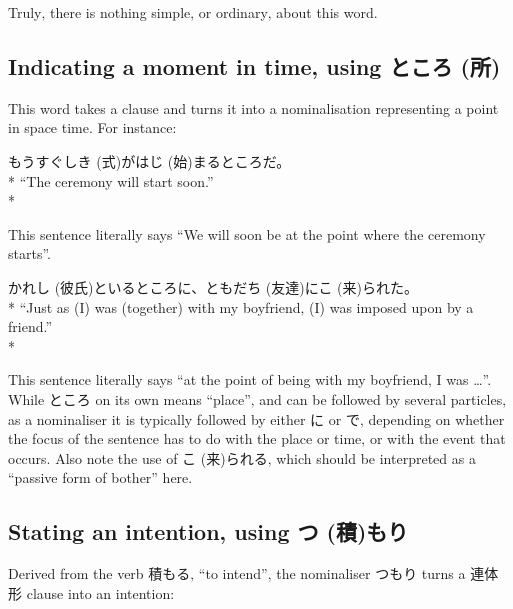 \documentclass[11pt, b5paper, twoside, openright, onecolumn]{book}
\makeatletter
\newcommand*{\rubystack}[2]{{\relscale{0.5}%
  \begin{tabular}[b]{@{}c@{}}%
    {#1}\\%
   {\textscale{2}{#2}}%
  \end{tabular}}%
}
\DeclareRobustCommand*{\ruby}[2]{%
  \mbox{%
    \setlength{\parskip}{0ex}%
    \BeginAccSupp{method=pdfstringdef,ActualText={#1}}%
      \rubystack{\phantom{#2}}{#1}%
      \llap{%
        \rubystack{#2}{\phantom{#1}}%
      }%
    \EndAccSupp{}%
  }%
}
\renewcommand*{\ruby}[2]{#2 (#1)}%
\newenvironment{exampleblock}{
\setlength{\parindent}{0.6in}
\begin{minipage}[t]{\dimexpr\textwidth-\parindent}}
{\end{minipage}}
\makeatother
\begin{document}
Truly‚ there is nothing simple‚ or ordinary‚ about this word.

\subsection{Indicating a moment in time‚ using \ruby{所}{ところ}}

This word takes a clause and turns it into a nominalisation representing a point in space time. For instance:

\vspace{0.4cm}
\begin{exampleblock}
もうすぐ\ruby{式}{しき}が\ruby{始}{はじ}まるところだ。 \\* 
“The ceremony will start soon.” \\* 
\end{exampleblock}
\vspace{0.2cm}

This sentence literally says “We will soon be at the point where the ceremony starts”.

\vspace{0.4cm}
\begin{exampleblock}
\ruby{彼氏}{かれし}といるところに、\ruby{友達}{ともだち}に\ruby{来}{こ}られた。 \\* 
“Just as (I) was (together) with my boyfriend‚ (I) was imposed upon by a friend.” \\* 
\end{exampleblock}
\vspace{0.2cm}

This sentence literally says “at the point of being with my boyfriend‚ I was …”. While ところ on its own means “place”‚ and can be followed by several particles‚ as a nominaliser it is typically followed by either に or で‚ depending on whether the focus of the sentence has to do with the place or time‚ or with the event that occurs. Also note the use of \ruby{来}{こ}られる‚ which should be interpreted as a “passive form of bother” here.

\subsection{Stating an intention‚ using \ruby{積}{つ}もり}

Derived from the verb 積もる‚ “to intend”‚ the nominaliser つもり turns a 連体形 clause into an intention:
\end{document}
